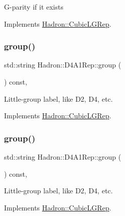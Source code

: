G-\/parity if it exists 

Implements \mbox{\hyperlink{structHadron_1_1CubicLGRep_ace26f7b2d55e3a668a14cb9026da5231}{Hadron\+::\+Cubic\+L\+G\+Rep}}.

\mbox{\label{structHadron_1_1D4A1Rep_a53f15be3789b2544092cd724838cbac8}} 
\subsubsection{\texorpdfstring{group()}{group()}\hspace{0.1cm}{\footnotesize\ttfamily [1/5]}}
{\footnotesize\ttfamily std\+::string Hadron\+::\+D4\+A1\+Rep\+::group (\begin{DoxyParamCaption}{ }\end{DoxyParamCaption}) const\hspace{0.3cm}{\ttfamily [inline]}, {\ttfamily [virtual]}}

Little-\/group label, like D2, D4, etc. 

Implements \mbox{\hyperlink{structHadron_1_1CubicLGRep_a9bdb14b519a611d21379ed96a3a9eb41}{Hadron\+::\+Cubic\+L\+G\+Rep}}.

\mbox{\label{structHadron_1_1D4A1Rep_a53f15be3789b2544092cd724838cbac8}} 
\subsubsection{\texorpdfstring{group()}{group()}\hspace{0.1cm}{\footnotesize\ttfamily [2/5]}}
{\footnotesize\ttfamily std\+::string Hadron\+::\+D4\+A1\+Rep\+::group (\begin{DoxyParamCaption}{ }\end{DoxyParamCaption}) const\hspace{0.3cm}{\ttfamily [inline]}, {\ttfamily [virtual]}}

Little-\/group label, like D2, D4, etc. 

Implements \mbox{\hyperlink{structHadron_1_1CubicLGRep_a9bdb14b519a611d21379ed96a3a9eb41}{Hadron\+::\+Cubic\+L\+G\+Rep}}.

\mbox{\label{structHadron_1_1D4A1Rep_a53f15be3789b2544092cd724838cbac8}} 
